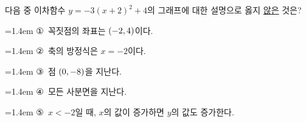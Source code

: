 다음 중 이차함수 $y=-3(x+2)^2+4$의 그래프에 대한 설명으로 옳지 \underline{않은} 것은?
\par\medskip\par\noindent\hangindent=1.4em {\small ①}\ 꼭짓점의 좌표는 $(-2{,}\mkern3mu\mathopen{}4)$이다.\par\noindent\hangindent=1.4em {\small ②}\ 축의 방정식은 $x=-2$이다.\par\noindent\hangindent=1.4em {\small ③}\ 점 $(0{,}\mkern3mu\mathopen{}-8)$을 지난다.\par\noindent\hangindent=1.4em {\small ④}\ 모든 사분면을 지난다.\par\noindent\hangindent=1.4em {\small ⑤}\ $x<-2$일 때, $x$의 값이 증가하면 $y$의 값도 증가한다.\par\medskip
